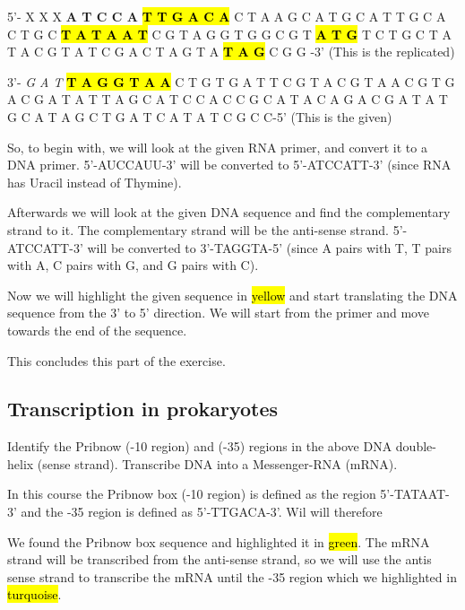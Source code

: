 5'- X X X \textbf{A T C C A} \textbf{\hl{T T G A C A}} C T A A G C A T G C A T T G C A C T G C \hl{\textbf{T A T A A T}} C G T A G G T G G C G T \textbf{\hl{A T G}} T C T G C T A T A C G T A T C G A C T A G T A \textbf{\hl{T A G}} C G G -3'      (This is the replicated)

\vspace{1em}

3’- \textit{G A T} \hl{\textbf{T A G G T A A}} C T G T G A T T C G T A C G T A A C G T G A C G A T A T T A G C A T C C A C C G C A T A C A G A C G A T A T G C A T A G C T G A T C A T A T C G C C-5’      (This is the given)

\vspace{1em}

So, to begin with, we will look at the given RNA primer, and convert it to a DNA primer.
5'-AUCCAUU-3' will be converted to 5'-ATCCATT-3' (since RNA has Uracil instead of Thymine). 


Afterwards we will look at the given DNA sequence and find the complementary strand to it. The complementary strand will be the anti-sense strand. 5'-ATCCATT-3' will be converted to 3'-TAGGTA-5' (since A pairs with T, T pairs with A, C pairs with G, and G pairs with C).


Now we will highlight the given sequence in \hl{yellow} and start translating the DNA sequence from the 3' to 5' direction. We will start from the primer and move towards the end of the sequence.

\vspace{1em}
This concludes this part of the exercise.

\subsection{Transcription in prokaryotes}
Identify the Pribnow (-10 region) and (-35) regions in the above DNA double-helix (sense strand). Transcribe DNA into a Messenger-RNA (mRNA).

\vspace{1em}
In this course the Pribnow box (-10 region) is defined as the region 5’-TATAAT-3’ and the -35 region is defined as 5’-TTGACA-3’. Wil will therefore 

We found the Pribnow box sequence and highlighted it in \hl{green}. The mRNA strand will be transcribed from the anti-sense strand, so we will use the antis sense strand to transcribe the mRNA until the -35 region which we highlighted in \hl{turquoise}.



